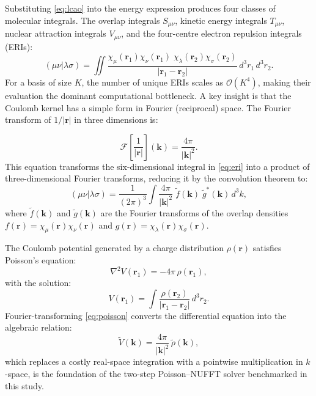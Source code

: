 \documentclass[12pt,a4paper]{article}
\begin{document}
Substituting \eqref{eq:lcao} into the energy expression produces four classes of molecular integrals. The overlap integrals $S_{\mu\nu}$, kinetic energy integrals $T_{\mu\nu}$, nuclear attraction integrals $V_{\mu\nu}$, and the four-centre electron repulsion integrals (ERIs):
\begin{equation}
 (\mu\nu|\lambda\sigma) = \iint \frac{\chi_\mu(\mathbf{r}_1)\chi_\nu(\mathbf{r}_1)\;\chi_\lambda(\mathbf{r}_2)\chi_\sigma(\mathbf{r}_2)}{|\mathbf{r}_1 - \mathbf{r}_2|}\,d^3r_1\,d^3r_2.
    \label{eq:eri}
\end{equation}
For a basis of size $K$, the number of unique ERIs scales as $\mathcal{O}(K^4)$, making their evaluation the dominant computational bottleneck. A key insight is that the Coulomb kernel has a simple form in Fourier (reciprocal) space. The Fourier transform of $1/|\mathbf{r}|$ in three dimensions is:

\begin{equation}
 \mathcal{F}\!\left[\frac{1}{|\mathbf{r}|}\right](\mathbf{k}) = \frac{4\pi}{|\mathbf{k}|^2}.
    \label{eq:coulomb_ft}
\end{equation}
This equation transforms the six-dimensional integral in \eqref{eq:eri} into a product of three-dimensional Fourier transforms, reducing it by the convolution theorem to:
\begin{equation}
 (\mu\nu|\lambda\sigma) = \frac{1}{(2\pi)^3}\int \frac{4\pi}{|\mathbf{k}|^2}\;\widetilde{f}(\mathbf{k})\;\widetilde{g}^*(\mathbf{k})\,d^3k,
    \label{eq:eri_kspace}
\end{equation}
where $\widetilde{f}(\mathbf{k})$ and $\widetilde{g}(\mathbf{k})$ are the Fourier transforms of the overlap densities $f(\mathbf{r}) = \chi_\mu(\mathbf{r})\chi_\nu(\mathbf{r})$ and $g(\mathbf{r}) = \chi_\lambda(\mathbf{r})\chi_\sigma(\mathbf{r})$.

The Coulomb potential generated by a charge distribution $\rho(\mathbf{r})$ satisfies Poisson's equation:
\begin{equation}
    \nabla^2 V(\mathbf{r}_1) = -4\pi\,\rho(\mathbf{r}_1),
    \label{eq:poisson}
\end{equation}
with the solution:
\begin{equation}
 V(\mathbf{r}_1) = \int \frac{\rho(\mathbf{r}_2)}{|\mathbf{r}_1 - \mathbf{r}_2|}\,d^3r_2.
    \label{eq:poisson_sol}
\end{equation}
Fourier-transforming \eqref{eq:poisson} converts the differential equation into the algebraic relation:
\begin{equation}
 \widetilde{V}(\mathbf{k}) = \frac{4\pi}{|\mathbf{k}|^2}\,\widetilde{\rho}(\mathbf{k}),
    \label{eq:poisson_kspace}
\end{equation}
which replaces a costly real-space integration with a pointwise multiplication in $k$-space, is the foundation of the two-step Poisson--NUFFT solver benchmarked in this study.
\end{document}

